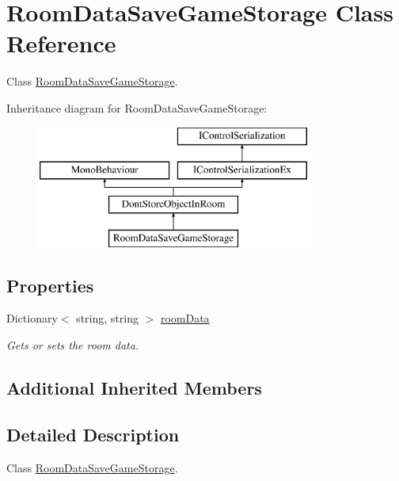 \hypertarget{class_room_data_save_game_storage}{}\section{Room\+Data\+Save\+Game\+Storage Class Reference}
\label{class_room_data_save_game_storage}


Class \hyperlink{class_room_data_save_game_storage}{Room\+Data\+Save\+Game\+Storage}.  


Inheritance diagram for Room\+Data\+Save\+Game\+Storage\+:\begin{figure}[H]
\begin{center}
\leavevmode
\includegraphics[height=4.000000cm]{class_room_data_save_game_storage}
\end{center}
\end{figure}
\subsection*{Properties}
\begin{DoxyCompactItemize}
\item 
Dictionary$<$ string, string $>$ \hyperlink{class_room_data_save_game_storage_a8fef019936e425c2566191550c4aab93}{room\+Data}
\begin{DoxyCompactList}\small\item\em Gets or sets the room data. \end{DoxyCompactList}\end{DoxyCompactItemize}
\subsection*{Additional Inherited Members}


\subsection{Detailed Description}
Class \hyperlink{class_room_data_save_game_storage}{Room\+Data\+Save\+Game\+Storage}. 



